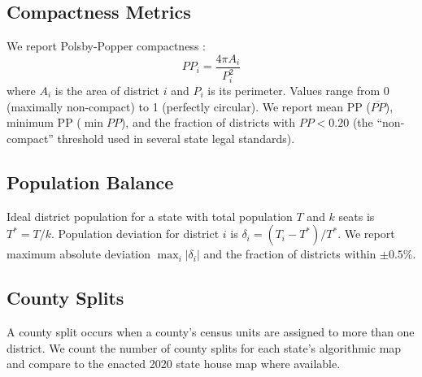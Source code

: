 \subsection{Compactness Metrics}
\label{sec:methodology:metrics}

We report Polsby-Popper compactness \citep{polsby1991third}:
\[
  PP_i = \frac{4\pi A_i}{P_i^2}
\]
where $A_i$ is the area of district $i$ and $P_i$ is its perimeter.
Values range from 0 (maximally non-compact) to 1 (perfectly circular).
We report mean PP ($\overline{PP}$), minimum PP ($\min PP$), and the
fraction of districts with $PP < 0.20$ (the ``non-compact'' threshold
used in several state legal standards).

\subsection{Population Balance}
\label{sec:methodology:balance}

Ideal district population for a state with total population $T$ and $k$ seats
is $T^* = T/k$. Population deviation for district $i$ is
$\delta_i = (T_i - T^*)/T^*$. We report maximum absolute deviation
$\max_i |\delta_i|$ and the fraction of districts within $\pm 0.5\%$.

\subsection{County Splits}
\label{sec:methodology:splits}

A county split occurs when a county's census units are assigned to more
than one district. We count the number of county splits for each state's
algorithmic map and compare to the enacted 2020 state house map where available.
